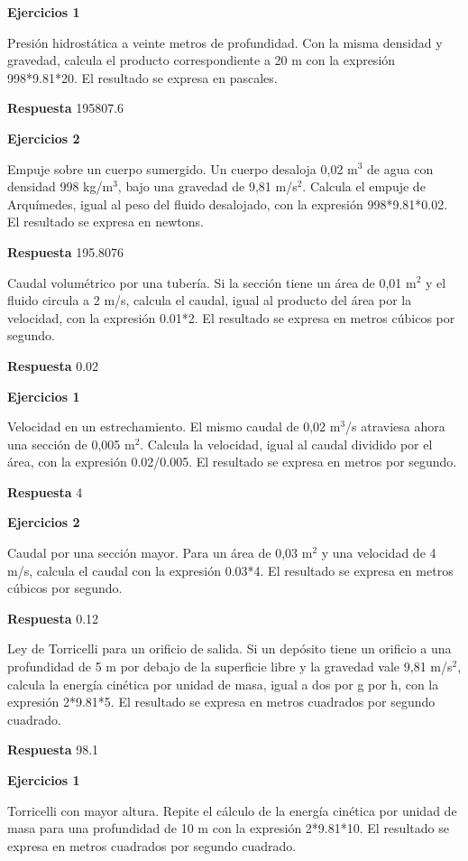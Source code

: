 \documentclass{book}
\begin{document}
\noindent\textbf{Ejercicios 1}

Presión hidrostática a veinte metros de profundidad. Con la misma densidad y gravedad, calcula el producto correspondiente a 20 m con la expresión 998*9.81*20. El resultado se expresa en pascales.

\noindent\textbf{Respuesta} 195807.6

\noindent\textbf{Ejercicios 2}

Empuje sobre un cuerpo sumergido. Un cuerpo desaloja 0,02 m\(^{3}\) de agua con densidad 998 kg/m\(^{3}\), bajo una gravedad de 9,81 m/s\(^{2}\). Calcula el empuje de Arquímedes, igual al peso del fluido desalojado, con la expresión 998*9.81*0.02. El resultado se expresa en newtons.

\noindent\textbf{Respuesta} 195.8076

Caudal volumétrico por una tubería. Si la sección tiene un área de 0,01 m\(^{2}\) y el fluido circula a 2 m/s, calcula el caudal, igual al producto del área por la velocidad, con la expresión 0.01*2. El resultado se expresa en metros cúbicos por segundo.

\noindent\textbf{Respuesta} 0.02

\noindent\textbf{Ejercicios 1}

Velocidad en un estrechamiento. El mismo caudal de 0,02 m\(^{3}\)/s atraviesa ahora una sección de 0,005 m\(^{2}\). Calcula la velocidad, igual al caudal dividido por el área, con la expresión 0.02/0.005. El resultado se expresa en metros por segundo.

\noindent\textbf{Respuesta} 4

\noindent\textbf{Ejercicios 2}

Caudal por una sección mayor. Para un área de 0,03 m\(^{2}\) y una velocidad de 4 m/s, calcula el caudal con la expresión 0.03*4. El resultado se expresa en metros cúbicos por segundo.

\noindent\textbf{Respuesta} 0.12

Ley de Torricelli para un orificio de salida. Si un depósito tiene un orificio a una profundidad de 5 m por debajo de la superficie libre y la gravedad vale 9,81 m/s\(^{2}\), calcula la energía cinética por unidad de masa, igual a dos por g por h, con la expresión 2*9.81*5. El resultado se expresa en metros cuadrados por segundo cuadrado.

\noindent\textbf{Respuesta} 98.1

\noindent\textbf{Ejercicios 1}

Torricelli con mayor altura. Repite el cálculo de la energía cinética por unidad de masa para una profundidad de 10 m con la expresión 2*9.81*10. El resultado se expresa en metros cuadrados por segundo cuadrado.
\end{document}
